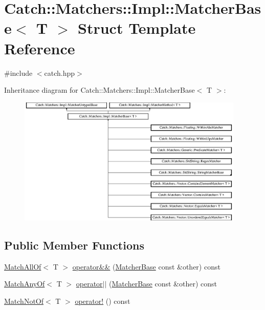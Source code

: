 \hypertarget{struct_catch_1_1_matchers_1_1_impl_1_1_matcher_base}{}\section{Catch\+:\+:Matchers\+:\+:Impl\+:\+:Matcher\+Base$<$ T $>$ Struct Template Reference}
\label{struct_catch_1_1_matchers_1_1_impl_1_1_matcher_base}


{\ttfamily \#include $<$catch.\+hpp$>$}

Inheritance diagram for Catch\+:\+:Matchers\+:\+:Impl\+:\+:Matcher\+Base$<$ T $>$\+:\begin{figure}[H]
\begin{center}
\leavevmode
\includegraphics[height=6.092978cm]{struct_catch_1_1_matchers_1_1_impl_1_1_matcher_base}
\end{center}
\end{figure}
\subsection*{Public Member Functions}
\begin{DoxyCompactItemize}
\item 
\mbox{\hyperlink{struct_catch_1_1_matchers_1_1_impl_1_1_match_all_of}{Match\+All\+Of}}$<$ T $>$ \mbox{\hyperlink{struct_catch_1_1_matchers_1_1_impl_1_1_matcher_base_a23c336f6d9457735ddc8dc7ea864d7c9}{operator\&\&}} (\mbox{\hyperlink{struct_catch_1_1_matchers_1_1_impl_1_1_matcher_base}{Matcher\+Base}} const \&other) const
\item 
\mbox{\hyperlink{struct_catch_1_1_matchers_1_1_impl_1_1_match_any_of}{Match\+Any\+Of}}$<$ T $>$ \mbox{\hyperlink{struct_catch_1_1_matchers_1_1_impl_1_1_matcher_base_a5f8542b8f1567a6f9c65d0a6da7b679b}{operator$\vert$$\vert$}} (\mbox{\hyperlink{struct_catch_1_1_matchers_1_1_impl_1_1_matcher_base}{Matcher\+Base}} const \&other) const
\item 
\mbox{\hyperlink{struct_catch_1_1_matchers_1_1_impl_1_1_match_not_of}{Match\+Not\+Of}}$<$ T $>$ \mbox{\hyperlink{struct_catch_1_1_matchers_1_1_impl_1_1_matcher_base_a5bb94bf2ff5c7ef73b7c11eb173bdf3b}{operator!}} () const
\end{DoxyCompactItemize}
